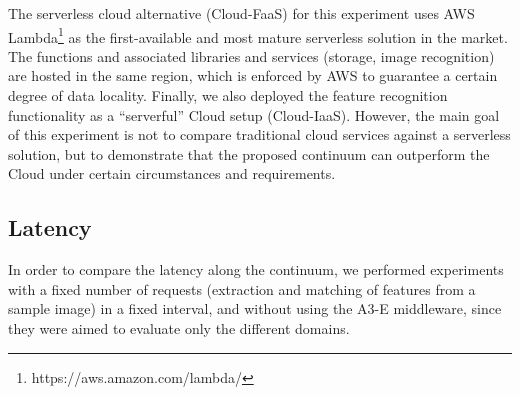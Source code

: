 


The serverless cloud alternative (Cloud-FaaS) for this experiment uses AWS Lambda\footnote{https://aws.amazon.com/lambda/} as the first-available and most mature serverless solution in the market. The functions and associated libraries and services (storage, image recognition) are hosted in the same region, which is enforced by AWS to guarantee a certain degree of data locality. Finally, we also deployed the feature recognition functionality as a ``serverful'' Cloud setup (Cloud-IaaS). However, the main goal of this experiment is not to compare traditional cloud services against a serverless solution, but to demonstrate that the proposed continuum can outperform the Cloud under certain circumstances and requirements.


\subsection{Latency} 

In order to compare the latency along the continuum, we performed experiments with a fixed number of requests (extraction and matching of features from a sample image) in a fixed interval, and without using the A3-E middleware, since they were aimed to evaluate only the different domains.

